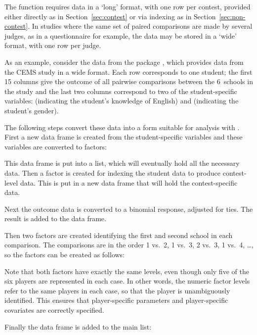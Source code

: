 The  function requires data in a `long' format, with one row per
contest, provided either directly as in Section~\ref{sec:contest} or via
indexing as in Section~\ref{sec:non-contest}. In studies where the same set of
paired comparisons are made by several judges, as in a questionnaire for
example, the data may be stored in a `wide' format, with one row per judge.

As an example, consider the  data from the  package \citep{hatz:12},
which provides data from the CEMS study in a wide format. Each row corresponds to
one student; the first 15 columns give the outcome of all pairwise comparisons
between the 6~schools in the study and the last two columns correspond to two
of the student-specific variables:  (indicating the student's knowledge
of English) and  (indicating the student's gender).

The following steps convert these data into a form suitable for analysis with
. First a new data frame is created from the student-specific
variables and these variables are converted to factors:

\Rcodeplaceholder{}

This data frame is put into a list, which will eventually hold all the
necessary data. Then a  factor is created for indexing
the student data to produce contest-level data. This is put in a new data frame
that will hold the contest-specific data.

\Rcodeplaceholder{}

Next the outcome data is converted to a binomial response, adjusted for
ties. The result is added to the  data frame.

\Rcodeplaceholder{}

Then two factors are created identifying the first and second school in each
comparison. The comparisons are in the order 1 vs.\ 2, 1 vs.\ 3, 2 vs.\ 3, 1
vs.\ 4, \ldots, so the factors can be created as follows:

\Rcodeplaceholder{}

Note that both factors have exactly the same levels, even though only five of
the six players are represented in each case. In other words, the numeric
factor levels refer to the same players in each case, so that the player is
unambiguously identified. This ensures that player-specific parameters and
player-specific covariates are correctly specified.

Finally the  data frame is added to the main list:

